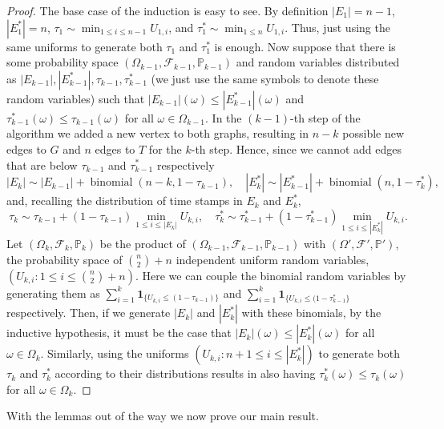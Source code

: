 \documentclass[11pt]{article}
\newcommand{\1}{\mathbf{1}} %
\newcommand{\prob}{\mathbb{P}} %
\newcommand{\bin}{\ensuremath{\operatorname{binomial}}} %
\begin{document}
\begin{proof}
The base case of the induction is easy to see. By definition $|E_1| = n-1$, $|E_1^*| = n$,
  $\tau_1 \sim \min_{1 \leq i \leq n-1} U_{1,i}$, and $\tau_1^* \sim \min_{1 \leq n} U_{1,i}$. Thus, just using the same uniforms to generate both $\tau_1$ and $\tau_1^*$ is enough. Now suppose that there is some probability space $(\Omega_{k-1},\mathcal{F}_{k-1},\prob_{k-1})$ and random variables distributed as $|E_{k-1}|,|E_{k-1}^*|,\tau_{k-1},\tau^*_{k-1}$ (we just use the same symbols to denote these random variables) such that $|E_{k-1}|(\omega) \leq |E_{k-1}^*|(\omega)$ and $\tau^*_{k-1}(\omega) \leq \tau_{k-1}(\omega)$ for all $\omega \in \Omega_{k-1}$. In the $(k-1)$-th step of the algorithm we added a new vertex to both graphs, resulting in $n-k$ possible new edges to $G$ and $n$ edges to $T$ for the $k$-th step. Hence, since we cannot add edges that are below $\tau_{k-1}$ and $\tau_{k-1}^*$ respectively
$$|E_k| \sim |E_{k-1}| + \bin(n-k,1-\tau_{k-1}), \quad |E_k^*| \sim |E_{k-1}^*| + \bin(n,1-\tau_k^*),$$
and, recalling the distribution of time stamps in $E_k$ and $E_k^*$,
$$\tau_k \sim \tau_{k-1} + (1-\tau_{k-1})\min_{1 \leq i \leq |E_k|} U_{k,i}, \quad \tau_k^* \sim \tau^*_{k-1} + (1-\tau^*_{k-1})\min_{1 \leq i \leq |E_k^*|} U_{k,i}.$$
Let $(\Omega_k, \mathcal{F}_k,\prob_k)$ be the product of $(\Omega_{k-1},\mathcal{F}_{k-1},\prob_{k-1})$ with $(\Omega', \mathcal{F}',\prob')$, the probability space of $\binom{n}{2}+n$ independent uniform random variables, $(U_{k,i} : 1 \leq i \leq \binom{n}{2}+n)$. Here we can couple the binomial random variables by generating them as $\sum_{i=1}^k \1_{\{U_{k,i} \leq (1-\tau_{k-1})\}}$ and $\sum_{i=1}^k \1_{\{U_{k,i} \leq (1-\tau^*_{k-1}\}}$ respectively. Then, if we generate $|E_k|$ and $|E_k^*|$ with these binomials, by the inductive hypothesis, it must be the case that $|E_k|(\omega) \leq |E_k^*|(\omega)$ for all $\omega \in \Omega_k$. Similarly, using the uniforms $(U_{k,i} : n+1 \leq i \leq |E_k^*|)$ to generate both $\tau_k$ and $\tau_k^*$ according to their distributions results in also having $\tau_k^*(\omega) \leq \tau_k(\omega)$ for all $\omega \in \Omega_k$.
\end{proof}

With the lemmas out of the way we now prove our main result.
\end{document}
